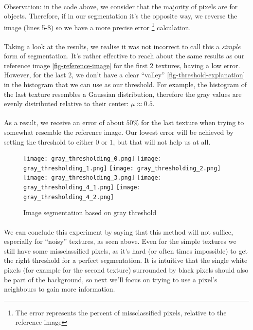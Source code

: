 \paragraph{}
Observation: in the code above, we consider that the majority of pixels are for objects.
Therefore, if in our segmentation it's the opposite way, we reverse the image (lines 5-8) so we have a more precise error \footnote{The error represents the percent of missclassified pixels, relative to the reference image} calculation.

\clearpage

\paragraph{}
Taking a look at the results, we realise it was not incorrect to call this a \emph{simple} form of segmentation.
It's rather effective to reach about the same results as our reference image \ref{fig-reference-image} for the first 2 textures, having a low error.
However, for the last 2, we don't have a clear ``valley'' \ref{fig-threshold-explanation} in the histogram that we can use as our threshold.
For example, the histogram of the last texture resembles a Gaussian distribution, therefore the gray values are evenly distributed relative to their center: $\mu\approx0.5$.
\paragraph{}
As a result, we receive an error of about $50\%$ for the last texture when trying to somewhat resemble the reference image.
Our lowest error will be achieved by setting the threshold to either $0$ or $1$, but that will not help us at all.

\begin{figure}[h]
    \centering
    \texttt{[image: gray\_thresholding\_0.png]}
    \texttt{[image: gray\_thresholding\_1.png]}
    \texttt{[image: gray\_thresholding\_2.png]}
    \texttt{[image: gray\_thresholding\_3.png]}
    \texttt{[image: gray\_thresholding\_4\_1.png]}
    \texttt{[image: gray\_thresholding\_4\_2.png]}
    \caption{Image segmentation based on gray threshold}
\end{figure}

\paragraph{}
We can conclude this experiment by saying that this method will not suffice, especially for ``noisy'' textures, as seen above.
Even for the simple textures we still have some missclassified pixels, as it's hard (or often times impossible) to get the right threshold for a perfect segmentation.
It is intuitive that the single white pixels (for example for the second texture) surrounded by black pixels should also be part of the background, so next we'll focus on trying to use a pixel's neighbours to gain more information.

